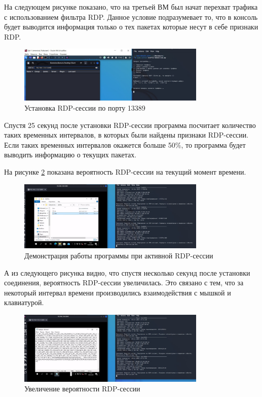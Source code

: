 \documentclass[bachelor, och, coursework]{SCWorks}
\begin{document}
На следующем рисунке показано, что на третьей ВМ был начат перехват трафика с использованием фильтра RDP. Данное условие подразумевает то,
что в консоль будет выводится информация только о тех пакетах которые несут в себе признаки RDP.

\begin{figure}[H]
  \centering
  \includegraphics[width=0.8\textwidth]{photo/rdpport2.jpg}
  \caption{Установка RDP-сессии по порту 13389}
  \label{rdpport2}
\end{figure}

Спустя 25 секунд после установки RDP-сессии программа посчитает количество таких временных интервалов, в которых были найдены
признаки RDP-сессии. Если таких временных интервалов окажется больше 50\%, то программа будет выводить информацию о текущих пакетах.

На рисунке \ref{rdpport3} показана вероятность RDP-сессии на текущий момент времени.

\begin{figure}[H]
  \centering
  \includegraphics[width=0.8\textwidth]{photo/rdpport3.jpg}
  \caption{Демонстрация работы программы при активной RDP-сессии}
  \label{rdpport3}
\end{figure}

А из следующего рисунка видно, что спустя несколько секунд после установки соединения, вероятность RDP-сессии увеличилась.
Это связано с тем, что за некоторый интервал времени производились взаимодействия с мышкой и клавиатурой.


\begin{figure}[H]
  \centering
  \includegraphics[width=0.8\textwidth]{photo/rdpport4.jpg}
  \caption{Увеличение вероятности RDP-сессии}
  \label{rdpport4}
\end{figure}
\end{document}
